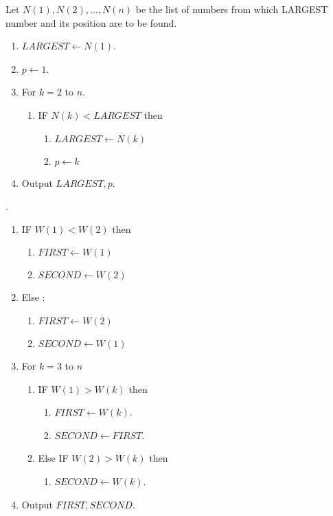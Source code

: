\begin{algorithm} Let $N(1),N(2),\dots,N(n)$ be the list of numbers from which LARGEST number and its position are to be found.
\begin{enumerate}
	\item $LARGEST \leftarrow N(1)$.
	\item $p \leftarrow 1$.
	\item For $k = 2$ to $n$.
	\begin{enumerate}
		\item IF $N(k) < LARGEST$ then
		\begin{enumerate}
			\item $LARGEST \leftarrow N(k)$
			\item $p \leftarrow k$
		\end{enumerate}
	\end{enumerate}
\item Output $LARGEST, p$.
\end{enumerate}
\end{algorithm}

\begin{algorithm}.
\begin{enumerate}
	\item IF $W(1) < W(2)$ then
	\begin{enumerate}
		\item $FIRST \leftarrow W(1)$
		\item $SECOND \leftarrow W(2)$
	\end{enumerate}
	\item Else :
	\begin{enumerate}
		\item $FIRST \leftarrow W(2)$
		\item $SECOND \leftarrow W(1)$
	\end{enumerate}
\item For $k = 3$ to $n$
	\begin{enumerate}
		\item IF $W(1) > W(k)$ then
		\begin{enumerate}
			\item $FIRST \leftarrow W(k)$.
			\item $SECOND \leftarrow FIRST$.
		\end{enumerate}
		\item Else IF $W(2) > W(k)$ then
		\begin{enumerate}
			\item $SECOND \leftarrow W(k)$.
		\end{enumerate}
	\end{enumerate}
	\item Output $FIRST, SECOND$.
\end{enumerate}
\end{algorithm}

